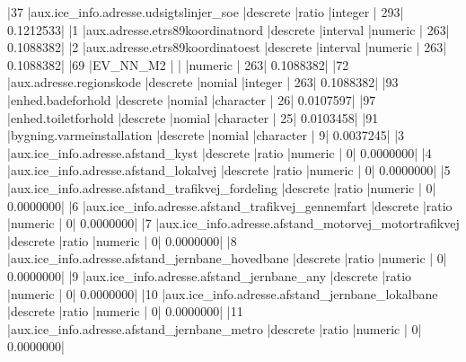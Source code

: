 \documentclass{report}
\begin{document}
\begin{Schunk}
\begin{Soutput}
|37  |aux.ice_info.adresse.udsigtslinjer_soe                        |descrete           |ratio          |integer         |            293|          0.1212533|
|1   |aux.adresse.etrs89koordinatnord                               |descrete           |interval       |numeric         |            263|          0.1088382|
|2   |aux.adresse.etrs89koordinatoest                               |descrete           |interval       |numeric         |            263|          0.1088382|
|69  |EV_NN_M2                                                      |                   |               |numeric         |            263|          0.1088382|
|72  |aux.adresse.regionskode                                       |descrete           |nomial         |integer         |            263|          0.1088382|
|93  |enhed.badeforhold                                             |descrete           |nomial         |character       |             26|          0.0107597|
|97  |enhed.toiletforhold                                           |descrete           |nomial         |character       |             25|          0.0103458|
|91  |bygning.varmeinstallation                                     |descrete           |nomial         |character       |              9|          0.0037245|
|3   |aux.ice_info.adresse.afstand_kyst                             |descrete           |ratio          |numeric         |              0|          0.0000000|
|4   |aux.ice_info.adresse.afstand_lokalvej                         |descrete           |ratio          |numeric         |              0|          0.0000000|
|5   |aux.ice_info.adresse.afstand_trafikvej_fordeling              |descrete           |ratio          |numeric         |              0|          0.0000000|
|6   |aux.ice_info.adresse.afstand_trafikvej_gennemfart             |descrete           |ratio          |numeric         |              0|          0.0000000|
|7   |aux.ice_info.adresse.afstand_motorvej_motortrafikvej          |descrete           |ratio          |numeric         |              0|          0.0000000|
|8   |aux.ice_info.adresse.afstand_jernbane_hovedbane               |descrete           |ratio          |numeric         |              0|          0.0000000|
|9   |aux.ice_info.adresse.afstand_jernbane_any                     |descrete           |ratio          |numeric         |              0|          0.0000000|
|10  |aux.ice_info.adresse.afstand_jernbane_lokalbane               |descrete           |ratio          |numeric         |              0|          0.0000000|
|11  |aux.ice_info.adresse.afstand_jernbane_metro                   |descrete           |ratio          |numeric         |              0|          0.0000000|

\end{Soutput}
\end{Schunk}
\end{document}
